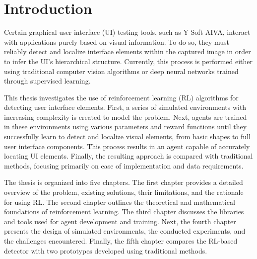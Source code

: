 \documentclass[
  digital,     %
  oneside,     %
  nosansbold,  %
  nocolorbold, %
  lof,         %
  lot,         %
]{fithesis4}
\begin{document}
\chapter*{Introduction}

Certain graphical user interface (UI) testing tools, such as Y Soft AIVA, interact with applications purely based on visual information. To do so, they must reliably detect and localize interface elements within the captured image in order to infer the UI's hierarchical structure. Currently, this process is performed either using traditional computer vision algorithms or deep neural networks trained through supervised learning.

This thesis investigates the use of reinforcement learning (RL) algorithms for detecting user interface elements. First, a series of simulated environments with increasing complexity is created to model the problem. Next, agents are trained in these environments using various parameters and reward functions until they successfully learn to detect and localize visual elements, from basic shapes to full user interface components. This process results in an agent capable of accurately locating UI elements. Finally, the resulting approach is compared with traditional methods, focusing primarily on ease of implementation and data requirements.

The thesis is organized into five chapters. The first chapter provides a detailed overview of the problem, existing solutions, their limitations, and the rationale for using RL. The second chapter outlines the theoretical and mathematical foundations of reinforcement learning. The third chapter discusses the libraries and tools used for agent development and training. Next, the fourth chapter presents the design of simulated environments, the conducted experiments, and the challenges encountered. Finally, the fifth chapter compares the RL-based detector with two prototypes developed using traditional methods.
\end{document}
